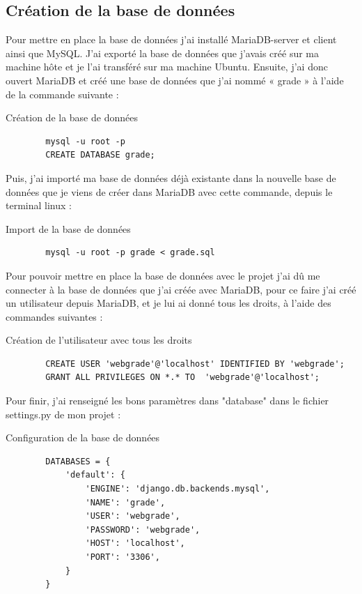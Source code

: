 \documentclass[12pt, a4paper]{article}
\begin{document}
    \subsection{Création de la base de données}
    Pour mettre en place la base de données j’ai installé MariaDB-server 
    et client ainsi que MySQL. J’ai exporté la base de données que j’avais 
    créé sur ma machine hôte et je l’ai transféré sur ma machine Ubuntu.
    Ensuite, j’ai donc ouvert MariaDB et créé une base de données que j’ai 
    nommé « grade » à l’aide de la commande suivante : 
    \begin{listing}[H]
        \caption{Création de la base de données}
        \label{lst:db}
        \begin{verbatim}
        mysql -u root -p
        CREATE DATABASE grade;
        \end{verbatim}
    \end{listing}
    Puis, j’ai importé ma base de données déjà existante dans la
    nouvelle base de données que je viens de créer dans MariaDB avec
    cette commande, depuis le terminal linux : 
    \begin{listing}[H]
        \caption{Import de la base de données}
        \label{lst:import}
        \begin{verbatim}
        mysql -u root -p grade < grade.sql
        \end{verbatim}
    \end{listing}
    Pour pouvoir mettre en place la base de données avec le projet
    j’ai dû me connecter à la base de données que j’ai créée avec MariaDB,
    pour ce faire j’ai créé un utilisateur depuis MariaDB, et je lui ai
    donné tous les droits, à l’aide des commandes suivantes :
    \begin{listing}[H]
        \caption{Création de l'utilisateur avec tous les droits}
        \label{lst:user}
        \begin{verbatim}
        CREATE USER 'webgrade'@'localhost' IDENTIFIED BY 'webgrade';
        GRANT ALL PRIVILEGES ON *.* TO  'webgrade'@'localhost';
        \end{verbatim}
    \end{listing}
    \newpage
    Pour finir, j'ai renseigné les bons paramètres dans "database" dans le
    fichier settings.py de mon projet :
    \begin{listing}[H]
        \caption{Configuration de la base de données}
        \label{lst:database}
        \begin{verbatim}
        DATABASES = {
            'default': {
                'ENGINE': 'django.db.backends.mysql',
                'NAME': 'grade',
                'USER': 'webgrade',
                'PASSWORD': 'webgrade',
                'HOST': 'localhost',
                'PORT': '3306',
            }
        }
        \end{verbatim}
    \end{listing}
\newpage
\end{document}
